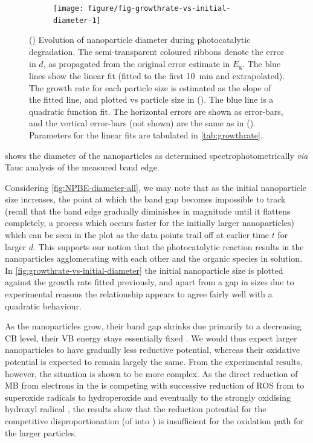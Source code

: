 \documentclass[9pt,twoside,twocolumn]{article}\usepackage{knitr}
\begin{document}
\begin{refsection}
\begin{figure}[tbh]
\begin{subfigure}[b]{0.48\linewidth}
\begin{knitrout}
{\centering \texttt{[image: figure/fig-growthrate-vs-initial-diameter-1]} 

}


\end{knitrout}
\end{subfigure}%
\caption{() Evolution of  nanoparticle diameter during photocatalytic degradation. The semi-transparent coloured ribbons denote the error in $d$, as propagated from the original error estimate in $E_\text{g}$. The blue lines show the linear fit (fitted to the first \qty{10}{\minute} and extrapolated).
The growth rate for each particle size is estimated as the slope of the fitted line, and plotted vs particle size in (). The blue line is a quadratic function fit. The horizontal errors are shown as error-bars, and the vertical error-bars (not shown) are the same as in ().
Parameters for the linear fits are tabulated in \cref{tab:growthrate}.}
\label{fig:diameter-and-growthrate}
\end{figure}

 shows the diameter of the  nanoparticles as determined spectrophotometrically \textit{via} Tauc analysis of the measured band edge.

Considering \cref{fig:NPBE-diameter-all}, we may note that as the initial nanoparticle size increases, the point at which the band gap becomes impossible to track (recall that the band edge gradually diminishes in magnitude until it flattens completely, a process which occurs faster for the initially larger nanoparticles) which can be seen in the plot as the data points trail off at earlier time $t$ for larger $d$. This supports our notion that the photocatalytic reaction results in the nanoparticles agglomerating with each other and the organic species in solution.
In \cref{fig:growthrate-vs-initial-diameter} the initial  nanoparticle size is plotted against the growth rate fitted previously, and apart from a gap in sizes due to experimental reasons the relationship appears to agree fairly well with a quadratic behaviour.

As the  nanoparticles grow, their band gap shrinks due primarily to a decreasing CB level, their VB energy stays essentially fixed \cite{Jacobsson2012a}. We would thus expect larger  nanoparticles to have gradually less reductive potential, whereas their oxidative potential is expected to remain largely the same.
From the experimental results, however, the situation is shown to be more complex.
As the direct reduction of MB from electrons in the  is competing with successive reduction of ROS from  to superoxide radicals  to hydroperoxide  and eventually to the strongly oxidising hydroxyl radical , the results show that the reduction potential for the competitive disproportionation (of  into ) is insufficient for the oxidation path for the larger  particles.



\end{refsection}
\end{document}
